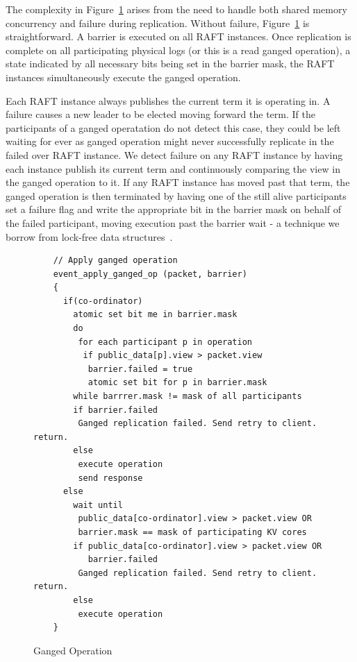 \documentclass[pageno]{jpaper}
\begin{document}
The complexity in Figure~\ref{fig:ganged_ops} arises from the need to handle
both shared memory concurrency and failure during replication. Without failure,
Figure~\ref{fig:ganged_ops} is straightforward. A barrier is executed on all
RAFT instances. Once replication is complete on all participating physical logs
(or this is a read ganged operation), a state indicated by all necessary bits
being set in the barrier mask, the RAFT instances simultaneously execute the
ganged operation.

Each RAFT instance always publishes the current term it is operating in. A
failure causes a new leader to be elected moving forward the term. If the
participants of a ganged operatation do not detect this case, they could be left
waiting for ever as ganged operation might never successfully replicate in the
failed over RAFT instance. We detect failure on any RAFT instance by having each
instance publish its current term and continuously comparing the view in the
ganged operation to it. If any RAFT instance has moved past that term, the
ganged operation is then terminated by having one of the still alive participants set a
failure flag and write the appropriate bit in the barrier mask on behalf of the
failed participant, moving execution past the barrier wait - a technique we
borrow from lock-free data structures~\cite{lock-free}.

\begin{figure}
  \centering
\begin{verbatim}
    // Apply ganged operation
    event_apply_ganged_op (packet, barrier)
    {
      if(co-ordinator)
        atomic set bit me in barrier.mask         
        do
         for each participant p in operation
          if public_data[p].view > packet.view
           barrier.failed = true 
           atomic set bit for p in barrier.mask
        while barrrer.mask != mask of all participants
        if barrier.failed
         Ganged replication failed. Send retry to client. return.
        else       
         execute operation
         send response
      else
        wait until 
         public_data[co-ordinator].view > packet.view OR
         barrier.mask == mask of participating KV cores
        if public_data[co-ordinator].view > packet.view OR
           barrier.failed
         Ganged replication failed. Send retry to client. return.
        else
         execute operation
    }
\end{verbatim}
\caption{Ganged Operation}
\label{fig:ganged_ops}
\end{figure}
\end{document}
